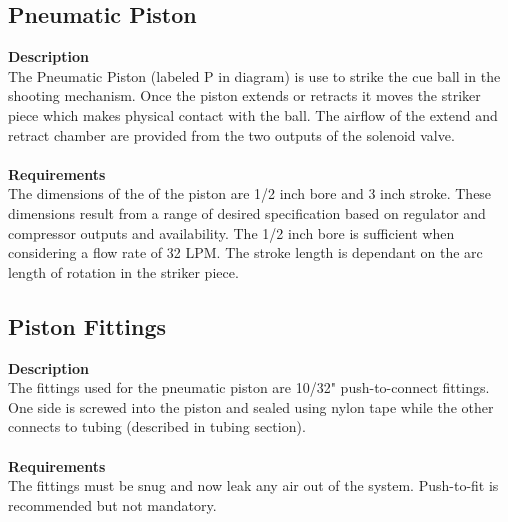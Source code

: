 \documentclass[titlepage]{article}
\begin{document}
\begin{center}
\begin{center}
\begin{center}
\begin{center}
\begin{center}
\begin{center}
\begin{center}
\begin{center}
\begin{center}
\begin{center}
\begin{center}
\begin{center}
\begin{center}
\begin{center}
\begin{center}
\begin{center}
\subsection{Pneumatic Piston}
\textbf{Description}\\
The Pneumatic Piston (labeled P in diagram) is use to strike the cue ball in the shooting mechanism. Once the piston extends or retracts it moves the striker piece which makes physical contact with the ball. The airflow of the extend and retract chamber are provided from the two outputs of the solenoid valve.\\\\
\textbf{Requirements}\\
 The dimensions of the of the piston are 1/2 inch bore and 3 inch stroke. These dimensions result from a range of desired specification based on regulator and compressor outputs and availability. The 1/2 inch bore is sufficient when considering a flow rate of 32 LPM. The stroke length is dependant on the arc length of rotation in the striker piece.
\begin{center}


\subsection{Piston Fittings}
\textbf{Description}\\
The fittings used for the pneumatic piston are 10/32" push-to-connect fittings. One side is screwed into the piston and sealed using nylon tape while the other connects to tubing (described in tubing section). \\\\
\textbf{Requirements}\\
The fittings must be snug and now leak any air out of the system. Push-to-fit is recommended but not mandatory. 
\begin{center}



\end{center}
\end{center}
\end{center}
\end{center}
\end{center}
\end{center}
\end{center}
\end{center}
\end{center}
\end{center}
\end{center}
\end{center}
\end{center}
\end{center}
\end{center}
\end{center}
\end{center}
\end{center}
\end{document}
